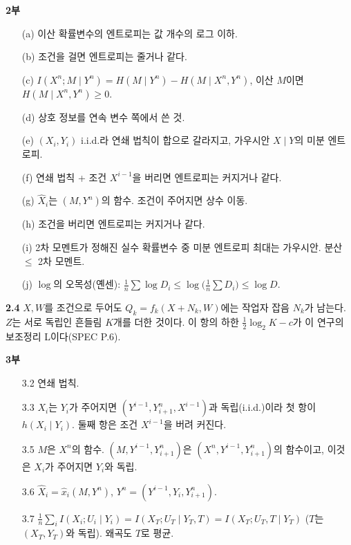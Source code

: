 \documentclass[11pt,a4paper]{article}
\begin{document}
\textbf{2부}
\begin{itemize}[leftmargin=2.2em]
\item[(a)] 이산 확률변수의 엔트로피는 값 개수의 로그 이하.
\item[(b)] 조건을 걸면 엔트로피는 줄거나 같다.
\item[(c)] $I(X^n;M\mid Y^n)=H(M\mid Y^n)-H(M\mid X^n,Y^n)$, 이산 $M$이면 $H(M\mid X^n,Y^n)\ge0$.
\item[(d)] 상호 정보를 연속 변수 쪽에서 쓴 것.
\item[(e)] $(X_i,Y_i)$ i.i.d.라 연쇄 법칙이 합으로 갈라지고, 가우시안 $X\mid Y$의 미분 엔트로피.
\item[(f)] 연쇄 법칙 + 조건 $X^{i-1}$을 버리면 엔트로피는 커지거나 같다.
\item[(g)] $\hat X_i$는 $(M,Y^n)$의 함수. 조건이 주어지면 상수 이동.
\item[(h)] 조건을 버리면 엔트로피는 커지거나 같다.
\item[(i)] 2차 모멘트가 정해진 실수 확률변수 중 미분 엔트로피 최대는 가우시안. 분산 $\le$ 2차 모멘트.
\item[(j)] $\log$의 오목성(옌센): $\frac1n\sum\log D_i\le\log\big(\frac1n\sum D_i\big)\le\log D$.
\end{itemize}

\textbf{2.4} $X,W$를 조건으로 두어도 $Q_k=f_k(X+N_k,W)$에는 작업자 잡음 $N_k$가 남는다. $Z$는 서로 독립인 흔들림 $K$개를 더한 것이다. 이 항의 하한 $\tfrac12\log_2K-c$가 이 연구의 보조정리 L이다(SPEC P.6).

\textbf{3부}
\begin{itemize}[leftmargin=2.2em]
\item[3.2] 연쇄 법칙.
\item[3.3] $X_i$는 $Y_i$가 주어지면 $(Y^{i-1},Y_{i+1}^n,X^{i-1})$과 독립(i.i.d.)이라 첫 항이 $h(X_i\mid Y_i)$. 둘째 항은 조건 $X^{i-1}$을 버려 커진다.
\item[3.5] $M$은 $X^n$의 함수. $(M,Y^{i-1},Y_{i+1}^n)$은 $(X^n,Y^{i-1},Y_{i+1}^n)$의 함수이고, 이것은 $X_i$가 주어지면 $Y_i$와 독립.
\item[3.6] $\hat X_i=\hat x_i(M,Y^n)$, $Y^n=(Y^{i-1},Y_i,Y_{i+1}^n)$.
\item[3.7] $\frac1n\sum_i I(X_i;U_i\mid Y_i)=I(X_T;U_T\mid Y_T,T)=I(X_T;U_T,T\mid Y_T)$ ($T$는 $(X_T,Y_T)$와 독립). 왜곡도 $T$로 평균.
\end{itemize}
\end{document}
